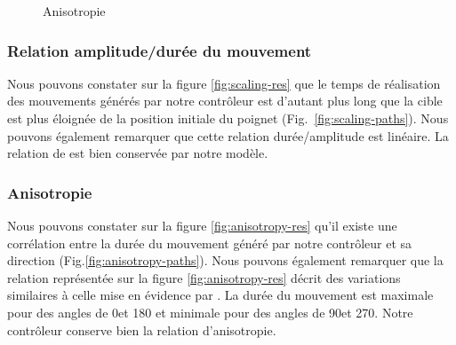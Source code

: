 \documentclass[pdftex,a4paper,11pt]{article}
\newenvironment{changemargin}[2]{\begin{list}{}{%
    \setlength{\topsep}{0pt}%
    \setlength{\leftmargin}{0pt}%
    \setlength{\rightmargin}{0pt}%
    \setlength{\listparindent}{\parindent}%
    \setlength{\itemindent}{\parindent}%
    \setlength{\parsep}{0pt plus 1pt}%
    \addtolength{\leftmargin}{#1}%
    \addtolength{\rightmargin}{#2}%
}\item }{\end{list}}
\begin{document}
\begin{figure}[p]
    \begin{changemargin}{-3.5cm}{-3.5cm}
      \centering
      \caption{Anisotropie}
      \label{fig:anisotropy}
    \end{changemargin}
\end{figure}

\subsubsection{Relation amplitude/durée du mouvement}

Nous pouvons constater sur la figure \ref{fig:scaling-res} que le temps de
réalisation des mouvements générés par notre contrôleur est d'autant plus long que la
cible est plus éloignée de la position initiale du poignet
(Fig.~\ref{fig:scaling-paths}).
Nous pouvons également remarquer que cette relation durée/amplitude est linéaire.
La relation de \cite{gordon94} est bien conservée par notre modèle.

\subsubsection{Anisotropie}

Nous pouvons constater sur la figure \ref{fig:anisotropy-res} qu'il existe une
corrélation entre la durée du mouvement généré par notre contrôleur et sa direction
(Fig.\ref{fig:anisotropy-paths}). 
Nous pouvons également remarquer que la relation représentée sur la figure
\ref{fig:anisotropy-res} décrit des variations similaires à celle mise en
évidence par \cite{gordon94}.
La durée du mouvement est maximale pour des angles de 0\textdegree et 180\textdegree
et minimale pour des angles de 90\textdegree et 270\textdegree.
Notre contrôleur conserve bien la relation d'anisotropie.
\end{document}
